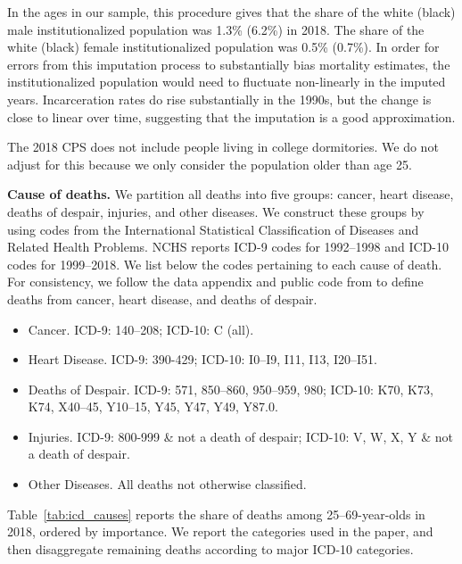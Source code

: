 In the ages in our sample, this procedure gives that the share of the
white (black) male institutionalized population was
1.3\% (6.2\%) in 2018. The share of the white (black) female
institutionalized population was 0.5\% (0.7\%). In order for errors
from this imputation process to substantially bias
mortality estimates, the institutionalized population would need to
fluctuate non-linearly in the imputed years. Incarceration rates do rise
substantially in the 1990s, but the change is close to linear over
time, suggesting that the imputation is a good approximation.

The 2018 CPS does not include people living in college dormitories. We
do not adjust for this because we only consider the population older
than age 25. 

\textbf{Cause of deaths.} We partition all deaths into five groups:
cancer, heart disease, deaths of despair, injuries, and other
diseases. We construct these groups by using codes from the
International Statistical Classification of Diseases and Related
Health Problems. NCHS reports ICD-9 codes for 1992--1998 and ICD-10
codes for 1999--2018. We list below the codes pertaining to each cause
of death. For consistency, we follow the data appendix and public code
from \citet{Case2017} to define deaths from cancer,
heart disease, and deaths of despair.

\begin{itemize}
\item Cancer. ICD-9: 140--208; ICD-10: C (all). 
\item Heart Disease. ICD-9: 390-429; ICD-10: I0--I9, I11, I13,
  I20--I51. 
\item Deaths of Despair. ICD-9: 571, 850--860, 950--959, 980; ICD-10:
  K70, K73, K74, X40--45, Y10--15, Y45, Y47, Y49, Y87.0. 
\item Injuries. ICD-9: 800-999 \& not a death of despair;
  ICD-10: V, W, X, Y \& not a death of despair. 
\item Other Diseases. All deaths not otherwise classified. 
\end{itemize}

Table~\ref{tab:icd_causes} reports the share of deaths among
25--69-year-olds in 2018, ordered by importance. We report the
categories used in the paper, and then disaggregate remaining deaths
according to major ICD-10 categories.
